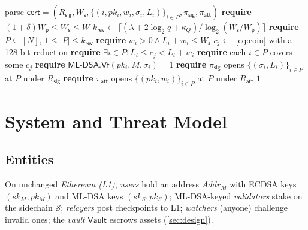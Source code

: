 \documentclass[10pt,journal,compsoc]{IEEEtran}
\theoremstyle{tplain}
\theoremstyle{tdef}
\theoremstyle{remark}
\newcommand{\Ws}{W_{\mathsf{s}}}
\newcommand{\Wp}{W_{\mathsf{p}}}
\newcommand{\Rsig}{R_{\mathsf{sig}}}
\newcommand{\Ratt}{R_{\mathsf{att}}}
\newcommand{\kr}{k_{\mathsf{rev}}}
\newcommand{\cert}{\mathsf{cert}}
\newcommand{\Vault}{\mathsf{Vault}}
\newcommand{\mldsa}{\textsf{ML-DSA}}
\begin{document}
\begin{algorithm}[t]
\caption{Certificate verification $\mathsf{Vf}(\Ratt,M,\Wp,\cert)$. The verifier state holds $W$, the number $N$ of positions of the attestor list (zero-weight positions included), and $d=\lceil\log_2 N\rceil$; $\delta$, $\kappa_Q$ and the design query bound $q=2^{64}$ are fixed in \cref{sec:cert}. All quantities are integers, and leaves have fixed-length encodings. Comments mark checks that were missing from, or different in, our prior prototype~\cite{NIROPoK2025}.}\label{alg:cert}
\footnotesize
\begin{algorithmic}[1]
\State parse $\cert=(\Rsig,\Ws,\{(i,pk_i,w_i,\sigma_i,L_i)\}_{i\in P},\pi_{\mathsf{sig}},\pi_{\mathsf{att}})$
\State \textbf{require} $(1+\delta)\Wp\le\Ws\le W$ 
\State $\kr\gets\lceil(\lambda+2\log_2 q+\kappa_Q)/\log_2(\Ws/\Wp)\rceil$ 
\State \textbf{require} $P\subseteq[N]$, $1\le|P|\le\kr$ 
 \textbf{require} $w_i>0 \wedge L_i+w_i\le \Ws$ 
\EndFor
\For{$j=0,\dots,\kr-1$}
  \State $c_j\gets$ \cref{eq:coin} with a 128-bit reduction
  \State \textbf{require} $\exists i\in P: L_i\le c_j<L_i+w_i$ 
\EndFor
\State \textbf{require} each $i\in P$ covers some $c_j$ 
 \textbf{require} $\mldsa.\mathsf{Vf}(pk_i,M,\sigma_i)=1$
\EndFor
\State \textbf{require} $\pi_{\mathsf{sig}}$ opens $\{(\sigma_i,L_i)\}_{i\in P}$ at $P$ under $\Rsig$
\State \textbf{require} $\pi_{\mathsf{att}}$ opens $\{(pk_i,w_i)\}_{i\in P}$ at $P$ under $\Ratt$
\State \Return $1$
\end{algorithmic}
\end{algorithm}

\section{System and Threat Model}\label{sec:model}

\subsection{Entities}
\noindent On unchanged \emph{Ethereum (L1)}, \emph{users} hold an address $\mathit{Addr}_M$ with ECDSA keys $(sk_M,pk_M)$ and ML-DSA keys $(sk_S,pk_S)$; ML-DSA-keyed \emph{validators} stake on the sidechain $\mathcal{S}$; \emph{relayers} post checkpoints to L1; \emph{watchers} (anyone) challenge invalid ones; the \emph{vault} $\Vault$ escrows assets (\cref{sec:design}).
\end{document}
